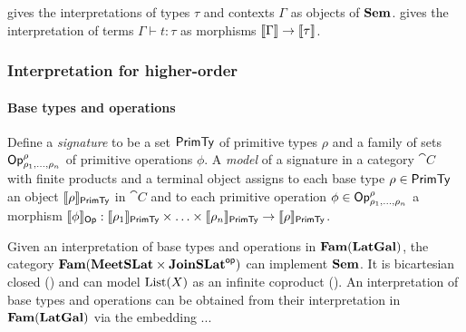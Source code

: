  gives the interpretations of types $\tau$ and contexts $\Gamma$ as objects of $\mathbf{Sem}$.
 gives the interpretation of terms $\Gamma \vdash t: \tau$ as morphisms $\llbracket \Gamma \rrbracket
\to \llbracket \tau \rrbracket$.

\subsubsection{Interpretation for higher-order \GPS}

\paragraph{Base types and operations}
Define a \emph{signature} to be a set $\mathsf{PrimTy}$ of primitive types $\rho$ and a family of sets
$\mathsf{Op}^\rho_{\rho_1,\ldots,\rho_n}$ of primitive operations $\phi$. A \emph{model} of a signature in a
category $\cat{C}$ with finite products and a terminal object assigns to each base type $\rho \in \mathsf{PrimTy}$ an
object $\llbracket \rho \rrbracket_{\mathsf{PrimTy}}$ in $\cat{C}$ and to each primitive operation $\phi \in
\mathsf{Op}^\rho_{\rho_1,\ldots,\rho_n}$ a morphism $\llbracket \phi \rrbracket_{\mathsf{Op}}: \llbracket \rho_1 \rrbracket_{\mathsf{PrimTy}} \times \ldots \times
\llbracket \rho_n \rrbracket_{\mathsf{PrimTy}} \to \llbracket \rho \rrbracket_{\mathsf{PrimTy}}$.

Given an interpretation of base types and operations in $\mathbf{Fam}(\mathbf{LatGal})$, the category $\mathbf{Fam}(\mathbf{MeetSLat} \times
\mathbf{JoinSLat}^{\mathsf{op}})$ can implement $\mathbf{Sem}$. It is bicartesian closed () and can model
$\mathrm{List}(X)$ as an infinite coproduct (). An interpretation
of base types and operations can be obtained from their interpretation in $\mathbf{Fam}(\mathbf{LatGal})$ via the embedding
...
